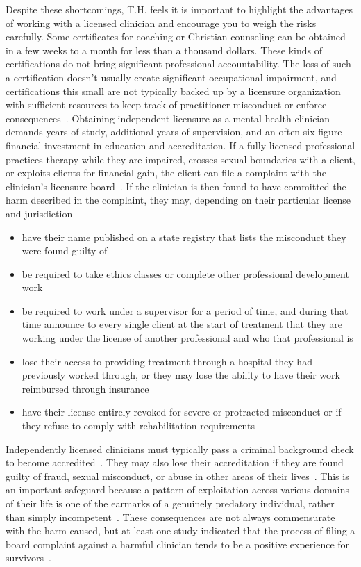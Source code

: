\documentclass[11pt,oneside]{book}
\let\cite\parencite
\begin{document}
Despite these shortcomings, T.H. feels it is important to highlight the advantages of working with a licensed clinician and encourage you to weigh the risks carefully. Some certificates for coaching or Christian counseling can be obtained in a few weeks to a month for less than a thousand dollars. These kinds of certifications do not bring significant professional accountability. The loss of such a certification doesn't usually create significant occupational impairment, and certifications this small are not typically backed up by a licensure organization with sufficient resources to keep track of practitioner misconduct or enforce consequences~\cite{carr2015end}. Obtaining independent licensure as a mental health clinician demands years of study, additional years of supervision, and an often six-figure financial investment in education and accreditation. If a fully licensed professional practices therapy while they are impaired, crosses sexual boundaries with a client, or exploits clients for financial gain, the client can file a complaint with the clinician's licensure board~\cite{vinson1987complaintProcedures,barsky2023licensing}. If the clinician is then found to have committed the harm described in the complaint, they may, depending on their particular license and jurisdiction
\begin{itemize}
    \item have their name published on a state registry that lists the misconduct they were found guilty of
    \item be required to take ethics classes or complete other professional development work
    \item be required to work under a supervisor for a period of time, and during that time announce to every single client at the start of treatment that they are working under the license of another professional and who that professional is
    \item lose their access to providing treatment through a hospital they had previously worked through, or they may lose the ability to have their work reimbursed through insurance
    \item have their license entirely revoked for severe or protracted misconduct or if they refuse to comply with rehabilitation requirements
\end{itemize}

Independently licensed clinicians must typically pass a criminal background check to become accredited~\cite{dunlap2021background}. They may also lose their accreditation if they are found guilty of fraud, sexual misconduct, or abuse in other areas of their lives~\cite{barsky2023licensing}. This is an important safeguard because a pattern of exploitation across various domains of their life is one of the earmarks of a genuinely predatory individual, rather than simply incompetent~\cite{cooke2001refining}. These consequences are not always commensurate with the harm caused, but at least one study indicated that the process of filing a board complaint against a harmful clinician tends to be a positive experience for survivors~\cite{vinson1987complaintProcedures}.
\end{document}
